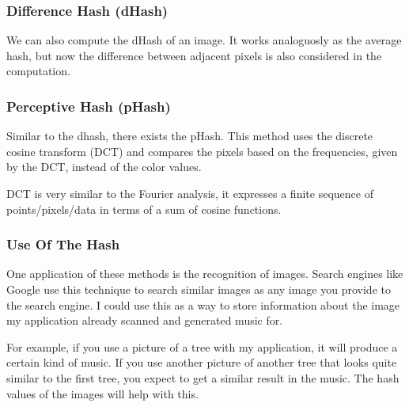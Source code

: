 \documentclass[12pt]{article}
\begin{document}
\subsubsection{Difference Hash (dHash)}
We can also compute the dHash of an image. It works analoguosly as the average hash, but now the difference between adjacent pixels is also considered in the computation.

\subsubsection{Perceptive Hash (pHash)}
Similar to the dhash, there exists the pHash. This method uses the discrete cosine transform (DCT) and compares the pixels based on the frequencies, given by the DCT, instead of the color values.

DCT is very similar to the Fourier analysis, it expresses a finite sequence of points/pixels/data in terms of a sum of cosine functions.

\subsubsection{Use Of The Hash}
One application of these methods is the recognition of images. Search engines like Google use this technique to search similar images as any image you provide to the search engine. I could use this as a way to store information about the image my application already scanned and generated music for.

For example, if you use a picture of a tree with my application, it will produce a certain kind of music. If you use another picture of another tree that looks quite similar to the first tree, you expect to get a similar result in the music. The hash values of the images will help with this. 
\end{document}
